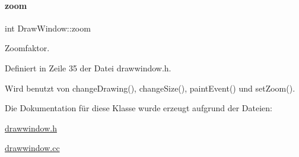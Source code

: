 \paragraph{\texorpdfstring{zoom}{zoom}}
{\footnotesize\ttfamily int Draw\+Window\+::zoom\hspace{0.3cm}{\ttfamily [private]}}



Zoomfaktor. 



Definiert in Zeile 35 der Datei drawwindow.\+h.



Wird benutzt von change\+Drawing(), change\+Size(), paint\+Event() und set\+Zoom().



Die Dokumentation für diese Klasse wurde erzeugt aufgrund der Dateien\+:\begin{DoxyCompactItemize}
\item 
\mbox{\hyperlink{drawwindow_8h}{drawwindow.\+h}}\item 
\mbox{\hyperlink{drawwindow_8cc}{drawwindow.\+cc}}\end{DoxyCompactItemize}
